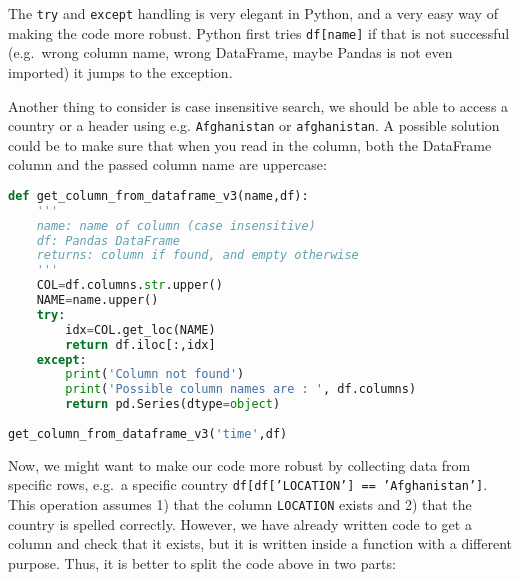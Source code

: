 \documentclass[graybox,sectrefs,envcountresetchap,open=right,final]{svmonodo}
\begin{document}
The \texttt{try} and \texttt{except} handling is very elegant in Python, and a very easy way of making the code more robust. Python first tries \texttt{df[name]} if that is not successful (e.g.~wrong column name, wrong DataFrame, maybe Pandas is not even imported) it jumps to the exception.

Another thing to consider is case insensitive search, we should be able to access a country or a header using e.g. \texttt{Afghanistan} or \texttt{afghanistan}. A possible solution could be to make sure that when you read in the column, both the DataFrame column and the passed column name are uppercase:


















\begin{lstlisting}[language=python,style=blue1bar]
def get_column_from_dataframe_v3(name,df):
    '''
    name: name of column (case insensitive)
    df: Pandas DataFrame
    returns: column if found, and empty otherwise 
    '''
    COL=df.columns.str.upper()
    NAME=name.upper()
    try:
        idx=COL.get_loc(NAME)
        return df.iloc[:,idx]
    except:
        print('Column not found')
        print('Possible column names are : ', df.columns)
        return pd.Series(dtype=object)
        
get_column_from_dataframe_v3('time',df)

\end{lstlisting}

Now, we might want to make our code more robust by collecting data from specific rows, e.g.~a specific country \texttt{df[df['LOCATION'] == 'Afghanistan']}. This operation assumes 1) that the column \texttt{LOCATION} exists and 2) that the country is spelled correctly. However, we have already written code to get a column and check that it exists, but it is written inside a function with a different purpose. Thus, it is better to split the code above in two parts:
\end{document}
